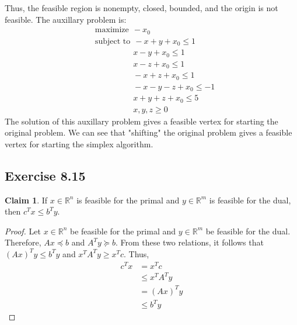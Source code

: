 \documentclass[letterpaper,12pt]{article}
\theoremstyle{definition}
\newtheorem{claim}[theorem]{Claim}
\begin{document}
Thus, the feasible region is nonempty, closed, bounded, and the origin is not feasible. 
The auxillary problem is:
\begin{align*}
&\text{maximize} \ \ -x_0 \\
  &\text{subject to} \ \ -x + y + x_0 \leq 1 \\
  &\qquad \qquad \ \ \ x - y + x_0\leq 1 \\
  &\qquad \qquad \ \ \ x - z + x_0 \leq 1 \\
  &\qquad \qquad \ \ \ -x + z + x_0\leq 1 \\
  &\qquad \qquad \ \ \ - x - y - z + x_0 \leq -1 \\
  &\qquad \qquad \ \ \ x + y + z + x_0 \leq 5 \\
  &\qquad \qquad \ \ \ x, y ,z \geq 0
\end{align*}
The solution of this auxillary problem gives a feasible vertex for starting the original problem. We can see that "shifting" the original problem gives a feasible vertex for starting the simplex algorithm. 

\subsection*{Exercise 8.15}
\begin{claim}
	If $x \in \mathbb{R}^n$ is feasible for the primal and $y \in \mathbb{R}^m$ is feasible for the dual, then $c^Tx \leq b^Ty$. 
\end{claim}

\begin{proof}
	Let $x \in \mathbb{R}^n$ be feasible for the primal and $y \in \mathbb{R}^m$ be feasible for the dual. Therefore, $Ax \preceq b$ and $A^Ty \succeq b$. From these two relations, it follows that$(Ax)^T y \leq b^T y$ and $x^TA^Ty \geq x^Tc$. Thus,
	\begin{align*}
	c^T x &= x^T c \tag{since the dot product is scalar} \\
	&\leq x^TA^T y \\
	&= (Ax)^T y \\
	&\leq b^T y
	\end{align*}
\end{proof}
\end{document}
